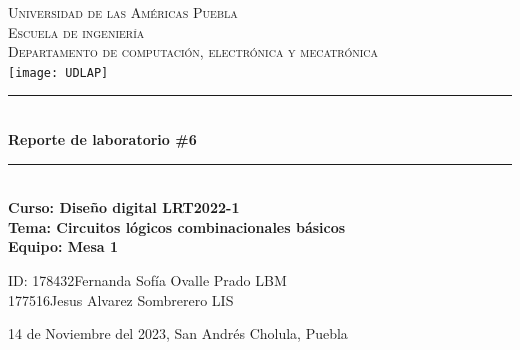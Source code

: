 \documentclass[12pt]{article}  %
\def\titulo{Reporte de laboratorio \#6}%
\def\materia{Curso: Diseño digital LRT2022-1} %
\def\fecha{14 de Noviembre del 2023} %
\def\equipo {Mesa 1}%
\def\ida{ID: 178432} %
\def\esta{Fernanda Sofía Ovalle Prado}
\def\lica{LBM}%
\def\idb{177516} %
\def\estb{Jesus Alvarez Sombrerero}
\def\licb{LIS}%
\def\topic{Circuitos lógicos combinacionales básicos}
\begin{document}
\begin{center}
    \newcommand{\HRule}{\rule{\linewidth}{0.5mm}}
    \thispagestyle{empty}
    \vspace*{-1.5cm}
    \textsc{\huge Universidad de las Américas Puebla}\\[1.5cm]
    \textsc{\LARGE Escuela de ingeniería}\\[1.5cm]
    \textsc{\LARGE Departamento de computación, electrónica y mecatrónica}\\[1.5cm]
    \texttt{[image: UDLAP]}  									\vspace*{1cm}														\HRule \\[0.4cm]
    { \huge \bfseries \titulo}\\[0.4cm]
    \HRule \\[1cm]
    { \Large \bfseries \materia}\\[1cm]
    { \Large \bfseries Tema: \topic}\\[1cm]
    { \Large \bfseries Equipo: \equipo}\\[1cm]
    \begin{flushleft} \Large
        \ida \hspace{0.5cm}\esta \hspace{0.5cm} \lica\\
        \idb \hspace{0.5cm}\estb \hspace{0.5cm} \licb\\
    \end{flushleft}
    \vfill
    \begin{center}
        {\Large  \fecha, San Andrés Cholula, Puebla}
    \end{center}
\end{center}							 								\newpage
\end{document}
